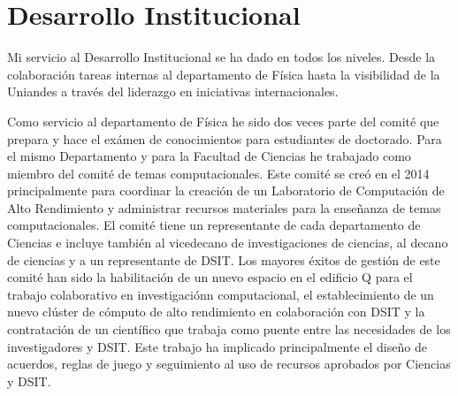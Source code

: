 \documentclass[letterpaper,12pt,onecolumn]{article}
\begin{document}
\pagestyle{empty}
\section*{{\Large{\sc Desarrollo Institucional}}}

Mi servicio al Desarrollo Institucional se ha dado en todos los
niveles. Desde la colaboraci\'on tareas internas al departamento de
F\'isica hasta la visibilidad de la Uniandes a trav\'es del liderazgo
en iniciativas internacionales. 

Como servicio al departamento de F\'isica he sido dos veces parte del
comit\'e que prepara y hace el ex\'amen de conocimientos para estudiantes
de doctorado.  Para el mismo Departamento y para la Facultad de
Ciencias he trabajado como miembro del comit\'e de temas
computacionales. Este comit\'e se cre\'o en el 2014 principalmente
para coordinar la creaci\'on de un Laboratorio de Computaci\'on de
Alto Rendimiento y administrar recursos materiales para la ense\~nanza
de temas computacionales. El comit\'e tiene un representante de cada
departamento de Ciencias e incluye tambi\'en al vicedecano de
investigaciones de ciencias, al decano de ciencias y a un
representante de DSIT. Los mayores \'exitos de gesti\'on de este
comit\'e han sido la habilitaci\'on de un nuevo espacio en el edificio
Q para el trabajo colaborativo en investigaci\'onn computacional, el
establecimiento de un nuevo cl\'uster de c\'omputo de alto rendimiento en
colaboraci\'on con DSIT y la contrataci\'on de un cient\'ifico que trabaja
como puente entre las necesidades de los investigadores y DSIT. Este
trabajo ha implicado principalmente el dise\~no de acuerdos, reglas de
juego y seguimiento al uso de recursos aprobados por Ciencias y DSIT.
\end{document}
